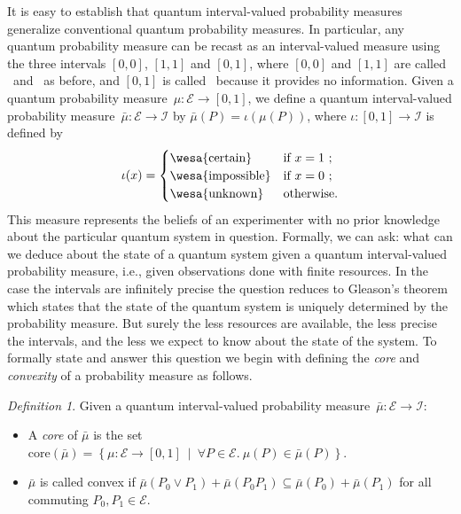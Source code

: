 \documentclass{article}
\theoremstyle{remark}
\newtheorem{definition}{Definition}
\newcommand{\events}{\ensuremath{\mathcal{E}}}
\newcommand{\pmeas}{\ensuremath{\mu}}
\newcommand{\imposs}{{\mbox{\wesa{impossible}}}}
\newcommand{\necess}{{\mbox{\wesa{certain}}}}
\newcommand{\unknown}{{\mbox{\wesa{unknown}}}}
\newcommand{\set}[2]{\ensuremath{\left\{ {#1}~\middle|~{#2}\right\} }}
\begin{document}
\noindent It is easy to establish that quantum interval-valued probability
measures generalize conventional quantum probability measures. In
particular, any quantum probability measure can be recast as an interval-valued
measure using the three intervals $\left[0,0\right]$, $\left[1,1\right]$
and \emph{$\left[0,1\right]$}, where $\left[0,0\right]$ and $\left[1,1\right]$
are called \imposs~and \necess~as before, and \emph{$\left[0,1\right]$}
is called \unknown~because it provides no information. Given a quantum
probability measure~$\mu:\events\rightarrow\left[0,1\right]$, we
define a quantum interval-valued probability measure~$\bar{\mu}:\events\rightarrow\mathscr{I}$
by $\bar{\mu}(P)=\iota\left(\mu(P)\right)$, where $\iota:\left[0,1\right]\rightarrow\mathscr{I}$
is defined by 
\begin{equation}
\iota(x)=\begin{cases}
\necess & \textrm{if }x=1\textrm{ ;}\\
\imposs & \textrm{if }x=0\textrm{ ;}\\
\unknown & \textrm{otherwise.}
\end{cases}\label{eq:homomorphism}
\end{equation}
This measure represents the beliefs of an experimenter with no prior
knowledge about the particular quantum system in question. Formally,
we can ask: what can we deduce about the state of a quantum system
given a quantum interval-valued probability measure, i.e., given observations
done with finite resources. In the case the intervals are infinitely
precise the question reduces to Gleason's theorem which states that
the state of the quantum system is uniquely determined by the probability
measure. But surely the less resources are available, the less precise
the intervals, and the less we expect to know about the state of the
system. To formally state and answer this question we begin with defining
the \emph{core} and \emph{convexity} of a probability measure as follows.

\begin{definition}
  Given a quantum interval-valued probability
  measure~$\bar{\mu}:\events\rightarrow\mathscr{I}$:
\begin{itemize}
\item A \emph{core} of $\bar{\mu}$ is the set $\mathrm{core}\left(\bar{\mu}\right)=\set{\pmeas:\events\rightarrow[0,1]}{\forall P\in\events.~\pmeas\left(P\right)\in\bar{\mu}\left(P\right)}$. 
\item $\bar{\mu}$ is called convex if
  $\bar{\mu}\left(P_{0}\vee
    P_{1}\right)+\bar{\mu}\left(P_{0}P_{1}\right)\subseteq\bar{\mu}\left(P_{0}\right)+\bar{\mu}\left(P_{1}\right)$
  for all commuting $P_{0},P_{1}\in\events$.
\end{itemize}
\end{definition}
\end{document}
